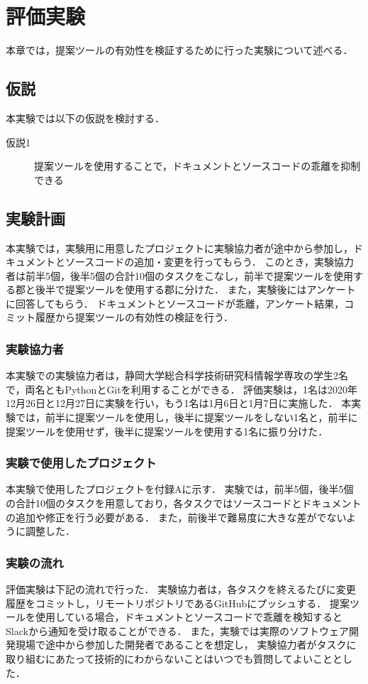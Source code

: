 \chapter{評価実験}
本章では，提案ツールの有効性を検証するために行った実験について述べる．

\section{仮説}
本実験では以下の仮説を検討する．

\begin{description}
    \item[仮説1] 提案ツールを使用することで，ドキュメントとソースコードの乖離を抑制できる
\end{description}

\section{実験計画}
本実験では，実験用に用意したプロジェクトに実験協力者が途中から参加し，ドキュメントとソースコードの追加・変更を行ってもらう．
このとき，実験協力者は前半5個，後半5個の合計10個のタスクをこなし，前半で提案ツールを使用する郡と後半で提案ツールを使用する郡に分けた．
また，実験後にはアンケートに回答してもらう．
ドキュメントとソースコードが乖離，アンケート結果，コミット履歴から提案ツールの有効性の検証を行う．

\subsection{実験協力者}
本実験での実験協力者は，静岡大学総合科学技術研究科情報学専攻の学生2名で，両名ともPythonとGitを利用することができる．
評価実験は，1名は2020年12月26日と12月27日に実験を行い，もう1名は1月6日と1月7日に実施した．
本実験では，前半に提案ツールを使用し，後半に提案ツールをしない1名と，前半に提案ツールを使用せず，後半に提案ツールを使用する1名に振り分けた．

\subsection{実験で使用したプロジェクト}
本実験で使用したプロジェクトを付録Aに示す．
実験では，前半5個，後半5個の合計10個のタスクを用意しており，各タスクではソースコードとドキュメントの追加や修正を行う必要がある．
また，前後半で難易度に大きな差がでないように調整した．

\subsection{実験の流れ}
評価実験は下記の流れで行った．
実験協力者は，各タスクを終えるたびに変更履歴をコミットし，リモートリポジトリであるGitHubにプッシュする．
提案ツールを使用している場合，ドキュメントとソースコードで乖離を検知するとSlackから通知を受け取ることができる．
また，実験では実際のソフトウェア開発現場で途中から参加した開発者であることを想定し，
実験協力者がタスクに取り組むにあたって技術的にわからないことはいつでも質問してよいこととした．

